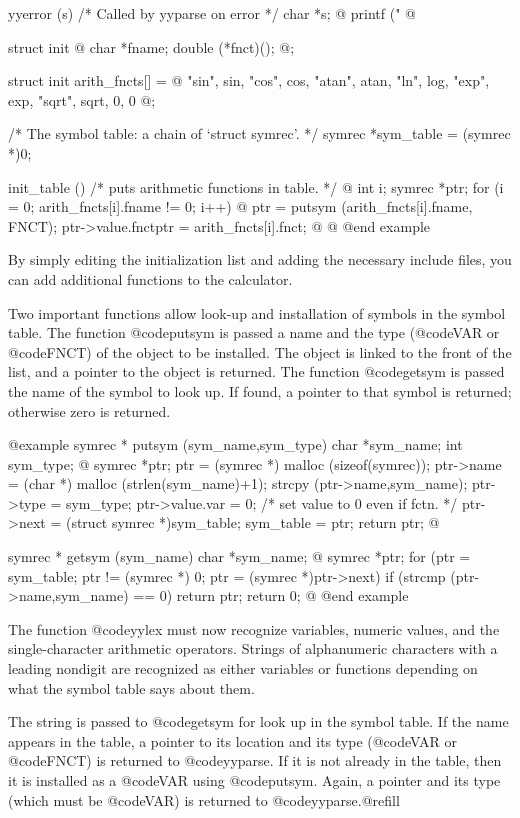 {{{{{{{{{{{{{{yyerror (s)  /* Called by yyparse on error */
     char *s;
@{
  printf ("%
@}

struct init
@{
  char *fname;
  double (*fnct)();
@};

struct init arith_fncts[]
  = @{
      "sin", sin,
      "cos", cos,
      "atan", atan,
      "ln", log,
      "exp", exp,
      "sqrt", sqrt,
      0, 0
    @};

/* The symbol table: a chain of `struct symrec'.  */
symrec *sym_table = (symrec *)0;

init_table ()  /* puts arithmetic functions in table. */
@{
  int i;
  symrec *ptr;
  for (i = 0; arith_fncts[i].fname != 0; i++)
    @{
      ptr = putsym (arith_fncts[i].fname, FNCT);
      ptr->value.fnctptr = arith_fncts[i].fnct;
    @}
@}
@end example

By simply editing the initialization list and adding the necessary include
files, you can add additional functions to the calculator.

Two important functions allow look-up and installation of symbols in the
symbol table.  The function @code{putsym} is passed a name and the type
(@code{VAR} or @code{FNCT}) of the object to be installed.  The object is
linked to the front of the list, and a pointer to the object is returned.
The function @code{getsym} is passed the name of the symbol to look up.  If
found, a pointer to that symbol is returned; otherwise zero is returned.

@example
symrec *
putsym (sym_name,sym_type)
     char *sym_name;
     int sym_type;
@{
  symrec *ptr;
  ptr = (symrec *) malloc (sizeof(symrec));
  ptr->name = (char *) malloc (strlen(sym_name)+1);
  strcpy (ptr->name,sym_name);
  ptr->type = sym_type;
  ptr->value.var = 0; /* set value to 0 even if fctn.  */
  ptr->next = (struct symrec *)sym_table;
  sym_table = ptr;
  return ptr;
@}

symrec *
getsym (sym_name)
     char *sym_name;
@{
  symrec *ptr;
  for (ptr = sym_table; ptr != (symrec *) 0;
       ptr = (symrec *)ptr->next)
    if (strcmp (ptr->name,sym_name) == 0)
      return ptr;
  return 0;
@}
@end example

The function @code{yylex} must now recognize variables, numeric values, and
the single-character arithmetic operators.  Strings of alphanumeric
characters with a leading nondigit are recognized as either variables or
functions depending on what the symbol table says about them.

The string is passed to @code{getsym} for look up in the symbol table.  If
the name appears in the table, a pointer to its location and its type
(@code{VAR} or @code{FNCT}) is returned to @code{yyparse}.  If it is not
already in the table, then it is installed as a @code{VAR} using
@code{putsym}.  Again, a pointer and its type (which must be @code{VAR}) is
returned to @code{yyparse}.@refill

}}}}}}}}}}}}}}
